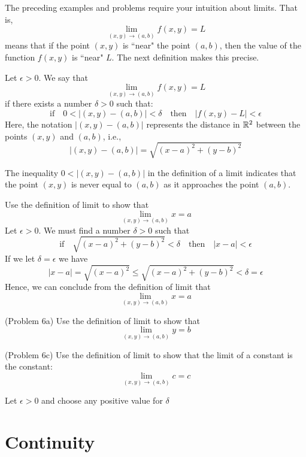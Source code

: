 \documentclass[handout]{ximera}
\begin{document}
The preceding examples and problems require your intuition about limits.  That is,
\[
\lim_{(x,y) \to (a,b)} f(x,y) = L
\]
means that if the point $(x,y)$ is ``near" the point $(a,b)$, then 
the value of the function $f(x, y)$ is ``near" $L$.
The next definition makes this precise.


\begin{definition}[Limit]
Let $\epsilon > 0$. We say that
\[
\lim_{(x,y) \to (a,b)} f(x,y) = L
\]
if there exists a number $\delta >0$ such that:
\[
\text{if} \quad 0< \left|(x,y) - (a,b)\right| < \delta \quad 
\text{then} \quad \left|f(x,y) - L\right| < \epsilon
\]
Here, the notation $|(x,y) - (a,b)|$ represents the distance in $\mathbb R^2$ between 
the points $(x,y)$ and $(a,b)$, i.e.,
\[
|(x,y) - (a,b)| = \sqrt{(x-a)^2 + (y-b)^2}
\]
\end{definition}

\begin{remark}
The inequality $0< |(x,y) - (a,b)|$ in the definition of a limit 
indicates that the point $(x,y)$ is never equal to $(a,b)$
as it approaches the point $(a,b)$.
\end{remark}

\begin{example}[Example 6]
Use the definition of limit to show that 
\[
\lim_{(x,y) \to (a,b)} x = a
\]
Let $\epsilon >0$.  We must find a number $\delta >0$ such that
\[
\text{if} \quad \sqrt{(x-a)^2 + (y-b)^2} < \delta \quad \text{then} \quad |x-a| < \epsilon
\]
If we let $\delta = \epsilon$ we have
\[
|x-a| = \sqrt{(x-a)^2} \leq \sqrt{(x-a)^2 + (y-b)^2} < \delta = \epsilon
\]
Hence, we can conclude from the definition of limit that
\[
\lim_{(x,y) \to (a,b)} x = a
\]
\end{example}

\begin{problem}(Problem 6a)
Use the definition of limit to show that 
\[
\lim_{(x,y) \to (a,b)} y = b
\]
\end{problem}

\begin{problem}(Problem 6c)
Use the definition of limit to show that the limit of a constant is the constant:
\[
\lim_{(x,y) \to (a,b)} c = c
\]
\begin{hint}
Let $\epsilon >0$ and choose any positive value for $\delta$
\end{hint}
\end{problem}


\section{Continuity}
\end{document}
